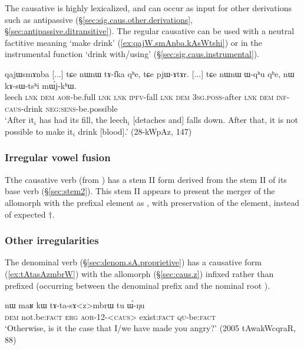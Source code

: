 The causative  is highly lexicalized, and can occur as input for other derivations such as antipassive (§\ref{sec:sig.caus.other.derivations}, §\ref{sec:antipassive.ditransitive}). The regular causative   can be used with a neutral factitive meaning `make drink' (\ref{ex:qajW.smAnba.kAsWtshi}) or in the instrumental function `drink with/using' (§\ref{sec:sig.caus.instrumental}).

\begin{exe} 
\ex \label{ex:qajW.smAnba.kAsWtshi}
\gll qajɯsmɤnba [...] tɕe nɯnɯ tɤ-fka qʰe, tɕe pjɯ-ɤtɤr. [...] tɕe nɯnɯ ɯ-qʰu qʰe, nɯ kɤ-sɯ-tsʰi mɯ́j-kʰɯ. \\
leech { } \textsc{lnk} \textsc{dem} \textsc{aor}-be.full \textsc{lnk} \textsc{lnk} \textsc{ipfv}-fall {  }  \textsc{lnk} \textsc{dem} \textsc{3sg}.\textsc{poss}-after \textsc{lnk} \textsc{dem} \textsc{inf}-\textsc{caus}-drink \textsc{neg}:\textsc{sens}-be.possible \\
\glt `After it$_i$ has had its fill, the leech$_i$ [detaches and] falls down. After that, it is not possible to make it$_i$ drink [blood].' (28-kWpAz, 147)
\end{exe}
 
 
\subsubsection{Irregular vowel fusion} \label{sec:caus.sAG}
Tthe causative verb  (from ) has a stem II form  derived from the stem II  of its base verb (§\ref{sec:stem2}). This stem II appears to present the merger of the  allomorph with the  prefixal element as , with preservation of the  element, instead of expected $\dagger$.


\subsubsection{Other irregularities} \label{sec:sig.caus.irregular.other}
The denominal verb  (§\ref{sec:denom.sA.proprietive}) has a causative form  (\ref{ex:tAtasAzmbrW}) with the  allomorph (§\ref{sec:caus.z}) infixed rather than prefixed (occurring between the denominal  prefix and the nominal root ).

\begin{exe} 
\ex \label{ex:tAtasAzmbrW}
\gll nɯ maʁ kɯ tɤ-ta-sɤ<z>mbrɯ tu ɯ́-ŋu \\
 \textsc{dem} not.be:\textsc{fact} \textsc{erg} \textsc{aor}-1\fl{}2-<\textsc{caus}> exist:\textsc{fact} \textsc{qu}-be:\textsc{fact} \\
 \glt `Otherwise, is it the case that I/we have made you angry?' (2005 tAwakWcqraR, 88)
 \end{exe}
 
